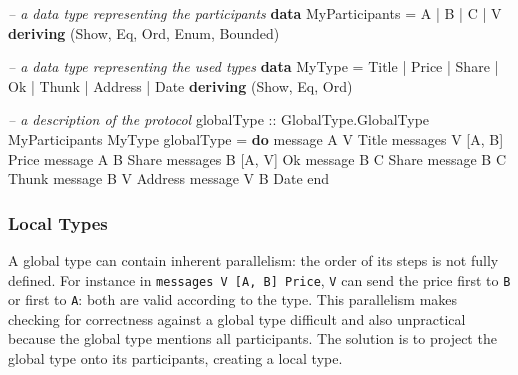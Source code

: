 \documentclass[runningheads,plain]{llncs}
\newenvironment{Shaded}{}{}
\newcommand{\KeywordTok}[1]{\textcolor[rgb]{0.00,0.44,0.13}{\textbf{#1}}}
\newcommand{\DataTypeTok}[1]{\textcolor[rgb]{0.56,0.13,0.00}{#1}}
\newcommand{\CommentTok}[1]{\textcolor[rgb]{0.38,0.63,0.69}{\textit{#1}}}
\newcommand{\OtherTok}[1]{\textcolor[rgb]{0.00,0.44,0.13}{#1}}
\newcommand{\FunctionTok}[1]{\textcolor[rgb]{0.02,0.16,0.49}{#1}}
\newcommand{\NormalTok}[1]{#1}
\begin{document}
\begin{Shaded}
\begin{Highlighting}[]
\CommentTok{-- a data type representing the participants}
\KeywordTok{data} \DataTypeTok{MyParticipants} \FunctionTok{=} \DataTypeTok{A} \FunctionTok{|} \DataTypeTok{B} \FunctionTok{|} \DataTypeTok{C} \FunctionTok{|} \DataTypeTok{V} 
    \KeywordTok{deriving}\NormalTok{ (}\DataTypeTok{Show}\NormalTok{, }\DataTypeTok{Eq}\NormalTok{, }\DataTypeTok{Ord}\NormalTok{, }\DataTypeTok{Enum}\NormalTok{, }\DataTypeTok{Bounded}\NormalTok{)}

\CommentTok{-- a data type representing the used types }
\KeywordTok{data} \DataTypeTok{MyType} \FunctionTok{=} \DataTypeTok{Title} \FunctionTok{|} \DataTypeTok{Price} \FunctionTok{|} \DataTypeTok{Share} \FunctionTok{|} \DataTypeTok{Ok} \FunctionTok{|} \DataTypeTok{Thunk} \FunctionTok{|} \DataTypeTok{Address} \FunctionTok{|} \DataTypeTok{Date}
    \KeywordTok{deriving}\NormalTok{ (}\DataTypeTok{Show}\NormalTok{, }\DataTypeTok{Eq}\NormalTok{, }\DataTypeTok{Ord}\NormalTok{)}

\CommentTok{-- a description of the protocol}
\OtherTok{globalType ::} \DataTypeTok{GlobalType.GlobalType} \DataTypeTok{MyParticipants} \DataTypeTok{MyType}
\NormalTok{globalType }\FunctionTok{=} \KeywordTok{do} 
\NormalTok{    message }\DataTypeTok{A} \DataTypeTok{V} \DataTypeTok{Title} 
\NormalTok{    messages }\DataTypeTok{V}\NormalTok{ [}\DataTypeTok{A}\NormalTok{, }\DataTypeTok{B}\NormalTok{] }\DataTypeTok{Price} 
\NormalTok{    message }\DataTypeTok{A} \DataTypeTok{B} \DataTypeTok{Share} 
\NormalTok{    messages }\DataTypeTok{B}\NormalTok{ [}\DataTypeTok{A}\NormalTok{, }\DataTypeTok{V}\NormalTok{] }\DataTypeTok{Ok} 
\NormalTok{    message }\DataTypeTok{B} \DataTypeTok{C} \DataTypeTok{Share}
\NormalTok{    message }\DataTypeTok{B} \DataTypeTok{C} \DataTypeTok{Thunk}
\NormalTok{    message }\DataTypeTok{B} \DataTypeTok{V} \DataTypeTok{Address}
\NormalTok{    message }\DataTypeTok{V} \DataTypeTok{B} \DataTypeTok{Date}
\NormalTok{    end}
\end{Highlighting}
\end{Shaded}

\subsubsection{Local Types}\label{local-types}

A global type can contain inherent parallelism: the order of its steps
is not fully defined. For instance in
\texttt{messages\ V\ {[}A,\ B{]}\ Price}, \texttt{V} can send the price
first to \texttt{B} or first to \texttt{A}: both are valid according to
the type. This parallelism makes checking for correctness against a
global type difficult and also unpractical because the global type
mentions all participants. The solution is to project the global type
onto its participants, creating a local type.
\end{document}

